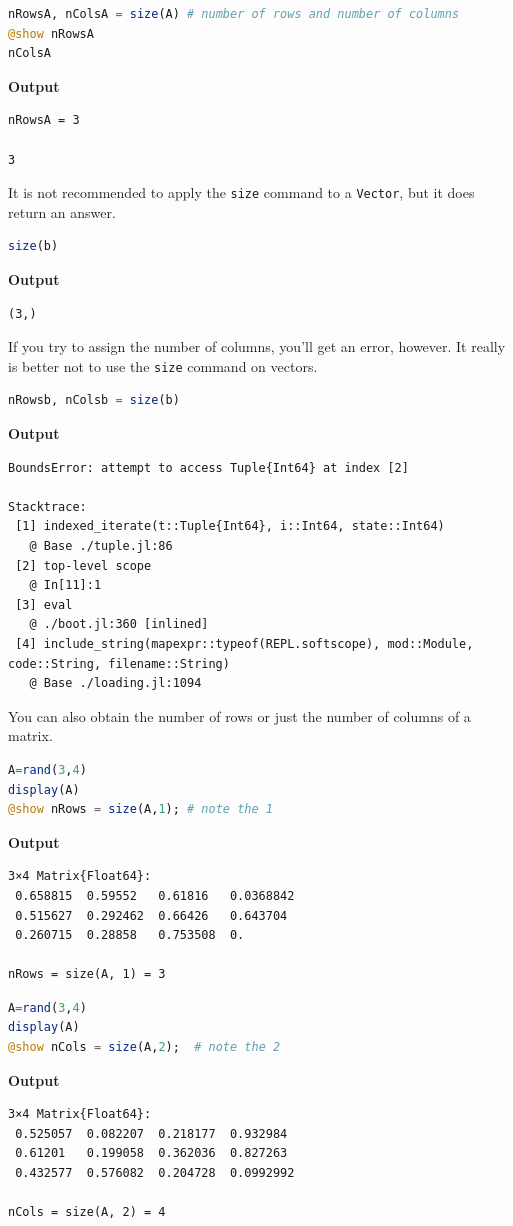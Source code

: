 \begin{lstlisting}[language=Julia,style=mystyle]
nRowsA, nColsA = size(A) # number of rows and number of columns 
@show nRowsA
nColsA
\end{lstlisting}
\textbf{Output} 
\begin{verbatim}
nRowsA = 3

3
\end{verbatim}

It is not recommended to apply the \texttt{size} command to a \texttt{Vector}, but it does return an answer.

\begin{lstlisting}[language=Julia,style=mystyle]
size(b)
\end{lstlisting}
\textbf{Output} 
\begin{verbatim}
(3,)
\end{verbatim}

If you try to assign the number of columns, you'll get an error, however. It really is better not to use the \texttt{size} command on vectors.

\begin{lstlisting}[language=Julia,style=mystyle]
nRowsb, nColsb = size(b)
\end{lstlisting}
\textbf{Output} 
\begin{verbatim}
BoundsError: attempt to access Tuple{Int64} at index [2]

Stacktrace:
 [1] indexed_iterate(t::Tuple{Int64}, i::Int64, state::Int64)
   @ Base ./tuple.jl:86
 [2] top-level scope
   @ In[11]:1
 [3] eval
   @ ./boot.jl:360 [inlined]
 [4] include_string(mapexpr::typeof(REPL.softscope), mod::Module, code::String, filename::String)
   @ Base ./loading.jl:1094

\end{verbatim}

You can also obtain the number of rows or just the number of columns of a matrix.

\begin{lstlisting}[language=Julia,style=mystyle]
A=rand(3,4)
display(A)
@show nRows = size(A,1); # note the 1
\end{lstlisting}
\textbf{Output} 
\begin{verbatim}
3×4 Matrix{Float64}:
 0.658815  0.59552   0.61816   0.0368842
 0.515627  0.292462  0.66426   0.643704
 0.260715  0.28858   0.753508  0.
 
nRows = size(A, 1) = 3
\end{verbatim}

\begin{lstlisting}[language=Julia,style=mystyle]
A=rand(3,4)
display(A)
@show nCols = size(A,2);  # note the 2
\end{lstlisting}
\textbf{Output} 
\begin{verbatim}
3×4 Matrix{Float64}:
 0.525057  0.082207  0.218177  0.932984
 0.61201   0.199058  0.362036  0.827263
 0.432577  0.576082  0.204728  0.0992992
 
nCols = size(A, 2) = 4
\end{verbatim}

